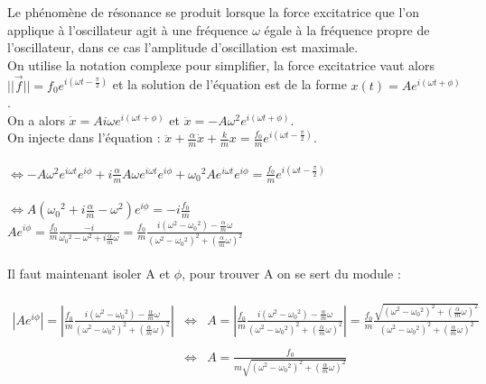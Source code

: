 \documentclass[a4paper,10pt]{book}
\begin{document}
Le phénomène de résonance se produit lorsque la force excitatrice que l'on applique à l'oscillateur agit à une fréquence $\omega$ égale à la fréquence propre de l'oscillateur, dans ce cas l'amplitude d'oscillation est maximale.\\

On utilise la notation complexe pour simplifier, la force excitatrice vaut alors $||\vec{f}||=f_{0}e^{i(\omega t-\frac{\pi}{2})}$ et la solution de l'équation est de la forme $x(t)=Ae^{i(\omega t +\phi)}$.\\
On a alors $\dot{x}=Ai\omega e^{i(\omega t +\phi)}$ et $\ddot{x}=-A\omega^{2} e^{i(\omega t +\phi)}$.\\

On injecte dans l'équation : $\ddot{x}+\frac{\alpha}{m}\dot{x}+\frac{k}{m}x=\frac{f_{0}}{m}e^{i(\omega t-\frac{\pi}{2})}$.\\\\
$\Leftrightarrow -A\omega^{2}e^{i\omega t}e^{i\phi}+i\frac{\alpha}{m}A\omega e^{i\omega t}e^{i\phi}+\omega_{0}{}^{2}Ae^{i\omega t}e^{i\phi}=\frac{f_{0}}{m}e^{i(\omega t-\frac{\pi}{2})}$\\\\
$\Leftrightarrow A(\omega_{0}{}^{2}+i\frac{\alpha}{m}-\omega^{2})e^{i\phi}=-i\frac{f_{0}}{m}$\\

$Ae^{i\phi}=\frac{f_{0}}{m}\frac{-i}{\omega_{0}{}^{2}-\omega^{2}+i\frac{\alpha}{m}\omega}=\frac{f_{0}}{m}\frac{i(\omega^{2}-\omega_{0}{}^{2})-\frac{\alpha}{m}\omega}{(\omega^{2}-\omega_{0}{}^{2})^{2}+(\frac{\alpha}{m}\omega)^{2}}$\\\\

Il faut maintenant isoler A et $\phi$, pour trouver A on se sert du module :\\\\
$\begin{array}{rcl} |Ae^{i\phi}|=|\frac{f_{0}}{m}\frac{i(\omega^{2}-\omega_{0}{}^{2})-\frac{\alpha}{m}\omega}{(\omega^{2}-\omega_{0}{}^{2})^{2}+(\frac{\alpha}{m}\omega)^{2}}|
&\Leftrightarrow& A=|\frac{f_{0}}{m}\frac{i(\omega^{2}-\omega_{0}{}^{2})-\frac{\alpha}{m}\omega}{(\omega^{2}-\omega_{0}{}^{2})^{2}+(\frac{\alpha}{m}\omega)^{2}}|=\frac{f_{0}}{m}\frac{\sqrt{(\omega^{2}-\omega_{0}{}^{2})^{2}+(\frac{\alpha}{m}\omega)^{2}}}{(\omega^{2}-\omega_{0}{}^{2})^{2}+(\frac{\alpha}{m}\omega)^{2}}\\\\
&\Leftrightarrow& A=\frac{f_{0}}{m\sqrt{(\omega^{2}-\omega_{0}{}^{2})^{2}+(\frac{\alpha}{m}\omega)^{2}}} \\\\ \end{array}$
\end{document}
